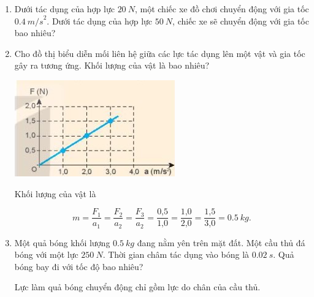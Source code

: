 \begin{enumerate}[label=\bfseries Câu \arabic*:]
		\item {}
	
	{
		
		Dưới tác dụng của hợp lực $\SI{20}{N}$, một chiếc xe đồ chơi chuyển động với gia tốc $\SI{0,4}{m/s}^2$. Dưới tác dụng của hợp lực $\SI{50}{N}$, chiếc xe sẽ chuyển động với gia tốc bao nhiêu?
	}
	
	\item {}
	
	
	{Cho đồ thị biểu diễn mối liên hệ giữa các lực tác dụng lên một vật và gia tốc gây ra tương ứng. Khối lượng của vật là bao nhiêu?
		
		\begin{center}
			\includegraphics[scale=1]{../figs/VN10-2022-PH-TP017-2.jpg}
		\end{center}
	}
	
	\hideall
	{	
		
		Khối lượng của vật là
		
		$$m = \dfrac{F_1}{a_1} = \dfrac{F_2}{a_2} = \dfrac{F_3}{a_2} = \dfrac{\text{0,5}}{\text{1,0}} = \dfrac{\text{1,0}}{\text{2,0}} =\dfrac{\text{1,5}}{\text{3,0}} = \SI{0,5}{kg}.$$
		
	}
	\item {}
	
	
	{Một quả bóng khối lượng $\SI{0,5}{kg}$ đang nằm yên trên mặt đất. Một cầu thủ đá bóng với một lực $\SI{250}{N}$. Thời gian châm tác dụng vào bóng là $\SI{0,02}{s}.$ Quả bóng bay đi với tốc độ bao nhiêu?
	}
	
	\hideall
	{
		Lực làm quả bóng chuyển động chỉ gồm lực do chân của cầu thủ.
		
}
\end{enumerate}
